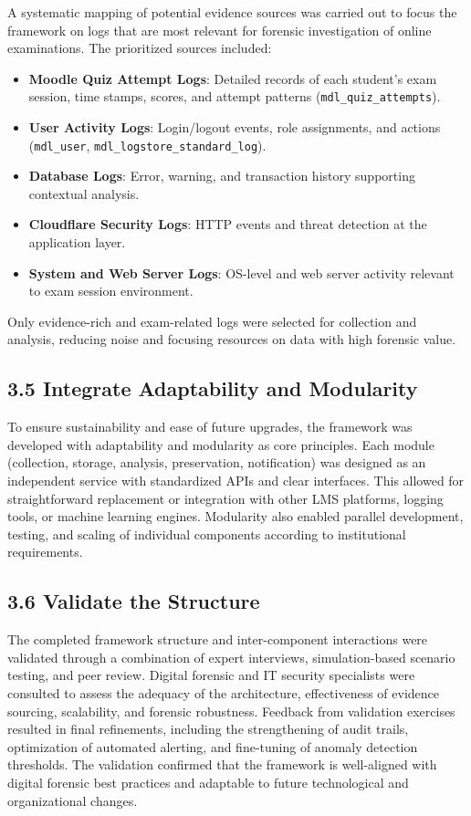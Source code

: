 A systematic mapping of potential evidence sources was carried out to focus the framework on logs that are most relevant for forensic investigation of online examinations. The prioritized sources included:
\begin{itemize}
	\item \textbf{Moodle Quiz Attempt Logs}: Detailed records of each student's exam session, time stamps, scores, and attempt patterns (\texttt{mdl\_quiz\_attempts}).
	\item \textbf{User Activity Logs}: Login/logout events, role assignments, and actions (\texttt{mdl\_user}, \texttt{mdl\_logstore\_standard\_log}).
	\item \textbf{Database Logs}: Error, warning, and transaction history supporting contextual analysis.
	\item \textbf{Cloudflare Security Logs}: HTTP events and threat detection at the application layer.
	\item \textbf{System and Web Server Logs}: OS-level and web server activity relevant to exam session environment.
\end{itemize}
Only evidence-rich and exam-related logs were selected for collection and analysis, reducing noise and focusing resources on data with high forensic value.

\subsection{3.5 Integrate Adaptability and Modularity}

To ensure sustainability and ease of future upgrades, the framework was developed with adaptability and modularity as core principles. Each module (collection, storage, analysis, preservation, notification) was designed as an independent service with standardized APIs and clear interfaces. This allowed for straightforward replacement or integration with other LMS platforms, logging tools, or machine learning engines. Modularity also enabled parallel development, testing, and scaling of individual components according to institutional requirements.

\subsection{3.6 Validate the Structure}

The completed framework structure and inter-component interactions were validated through a combination of expert interviews, simulation-based scenario testing, and peer review. Digital forensic and IT security specialists were consulted to assess the adequacy of the architecture, effectiveness of evidence sourcing, scalability, and forensic robustness. Feedback from validation exercises resulted in final refinements, including the strengthening of audit trails, optimization of automated alerting, and fine-tuning of anomaly detection thresholds. The validation confirmed that the framework is well-aligned with digital forensic best practices and adaptable to future technological and organizational changes.


